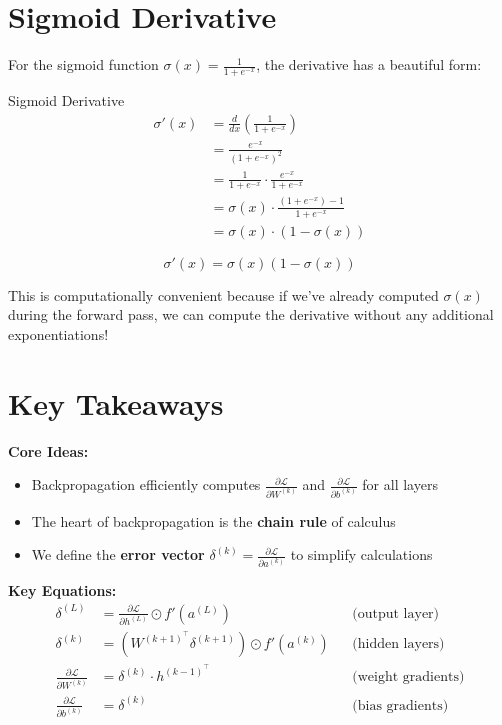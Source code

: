 \section{Sigmoid Derivative}

For the sigmoid function $\sigma(x) = \frac{1}{1 + e^{-x}}$, the derivative has a beautiful form:

\begin{derivation}{Sigmoid Derivative}
\begin{align}
\sigma'(x) &= \frac{d}{dx}\left(\frac{1}{1 + e^{-x}}\right) \\
&= \frac{e^{-x}}{(1 + e^{-x})^2} \\
&= \frac{1}{1 + e^{-x}} \cdot \frac{e^{-x}}{1 + e^{-x}} \\
&= \sigma(x) \cdot \frac{(1 + e^{-x}) - 1}{1 + e^{-x}} \\
&= \sigma(x) \cdot (1 - \sigma(x))
\end{align}

\[
\boxed{\sigma'(x) = \sigma(x)(1 - \sigma(x))}
\]
\end{derivation}

This is computationally convenient because if we've already computed $\sigma(x)$ during the forward pass, we can compute the derivative without any additional exponentiations!

\section{Key Takeaways}

\begin{summary}
\textbf{Core Ideas:}
\begin{itemize}
    \item Backpropagation efficiently computes $\frac{\partial \mathcal{L}}{\partial W^{(k)}}$ and $\frac{\partial \mathcal{L}}{\partial b^{(k)}}$ for all layers
    \item The heart of backpropagation is the \textbf{chain rule} of calculus
    \item We define the \textbf{error vector} $\delta^{(k)} = \frac{\partial \mathcal{L}}{\partial a^{(k)}}$ to simplify calculations
\end{itemize}

\textbf{Key Equations:}
\begin{align}
\delta^{(L)} &= \frac{\partial \mathcal{L}}{\partial h^{(L)}} \odot f'(a^{(L)}) && \text{(output layer)} \\
\delta^{(k)} &= \left( W^{(k+1)^\top} \delta^{(k+1)} \right) \odot f'(a^{(k)}) && \text{(hidden layers)} \\
\frac{\partial \mathcal{L}}{\partial W^{(k)}} &= \delta^{(k)} \cdot h^{(k-1)^\top} && \text{(weight gradients)} \\
\frac{\partial \mathcal{L}}{\partial b^{(k)}} &= \delta^{(k)} && \text{(bias gradients)}
\end{align}
\end{summary}
